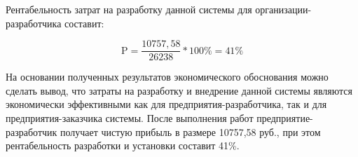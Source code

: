 Рентабельность затрат на разработку данной системы для организации-разработчика составит:

\begin{equation}
  \label{eq:economics:profit}
  \text{P} = \dfrac{10757,58}{26238} * 100\% = 41\% %
\end{equation}

На основании полученных результатов экономического обоснования можно сделать вывод,
что затраты на разработку и внедрение данной системы являются экономически эффективными
как для предприятия-разработчика, так и для предприятия-заказчика системы. После выполнения
работ предприятие-разработчик получает чистую прибыль в размере 10757,58 руб., при этом
рентабельность разработки и установки составит 41\%.




  
  
